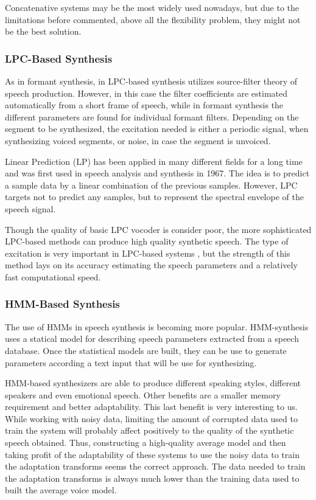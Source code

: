 Concatenative systems may be the most widely used nowadays, but due to the limitations before commented, above all the flexibility problem, they might not be the best solution.

\subsubsection{LPC-Based Synthesis}
\label{lpc_based_speech_synthesis}
As in formant synthesis, in LPC-based synthesis utilizes source-filter theory of speech production. However, in this case the filter coefficients are estimated automatically from a short frame of speech, while in formant synthesis the different parameters are found for individual formant filters. Depending on the segment to be synthesized, the excitation needed is either a periodic signal, when synthesizing voiced segments, or noise, in case the segment is unvoiced. 

Linear Prediction (LP) has been applied in many different fields for a long time and was first used in speech analysis and synthesis in 1967. The idea is to predict a sample data by a linear combination of the previous samples. However, LPC targets not to predict any samples, but to represent the spectral envelope of the speech signal. 

Though the quality of basic LPC vocoder is consider poor, the more sophisticated LPC-based methods can produce high quality synthetic speech. The type of excitation is very important in LPC-based systems \cite{TuomoMSc}, but the strength of this method lays on its accuracy estimating the speech parameters and a relatively fast computational speed.

\subsubsection{HMM-Based Synthesis}
\label{hmm_based_speech_synthesis}
The use of HMMs in speech synthesis is becoming more popular. HMM-synthesis uses a statical model for describing speech parameters extracted from a speech database. Once the statistical models are built, they can be use to generate parameters according a text input that will be use for synthesizing. 

HMM-based synthesizers are able to produce different speaking styles, different speakers and even emotional speech. Other benefits are a smaller memory requirement and better adaptability. This last benefit is very interesting to us. While working with noisy data, limiting the amount of corrupted data used to train the system will probably affect positively to the quality of the synthetic speech obtained. Thus, constructing a high-quality average model and then taking profit of the adaptability of these systems to use the noisy data to train the adaptation transforms seems the correct approach. The data needed to train the adaptation transforms is always much lower than the training data used to built the average voice model.

